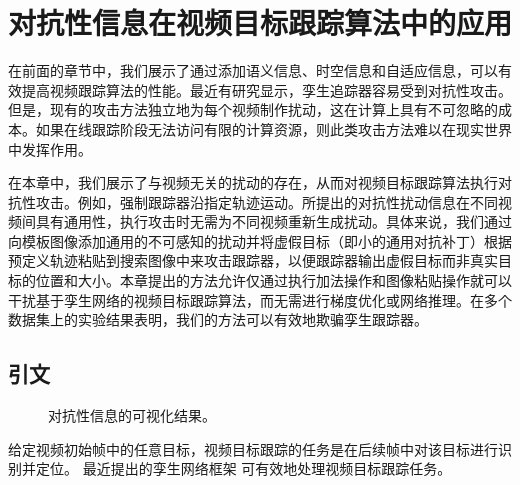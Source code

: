 \chapter{对抗性信息在视频目标跟踪算法中的应用} \label{chap:attack}
在前面的章节中，我们展示了通过添加语义信息、时空信息和自适应信息，可以有效提高视频跟踪算法的性能。最近有研究显示，孪生追踪器容易受到对抗性攻击。但是，现有的攻击方法独立地为每个视频制作扰动，这在计算上具有不可忽略的成本。如果在线跟踪阶段无法访问有限的计算资源，则此类攻击方法难以在现实世界中发挥作用。

在本章中，我们展示了与视频无关的扰动的存在，从而对视频目标跟踪算法执行对抗性攻击。例如，强制跟踪器沿指定轨迹运动。所提出的对抗性扰动信息在不同视频间具有通用性，执行攻击时无需为不同视频重新生成扰动。具体来说，我们通过向模板图像添加通用的不可感知的扰动并将虚假目标（即小的通用对抗补丁）根据预定义轨迹粘贴到搜索图像中来攻击跟踪器，以便跟踪器输出虚假目标而非真实目标的位置和大小。本章提出的方法允许仅通过执行加法操作和图像粘贴操作就可以干扰基于孪生网络的视频目标跟踪算法，而无需进行梯度优化或网络推理。在多个数据集上的实验结果表明，我们的方法可以有效地欺骗孪生跟踪器。

\section{引文}

\begin{figure}[t]
\centering
{} \qquad 
{}
\caption{对抗性信息的可视化结果。}
\end{figure}

给定视频初始帧中的任意目标，视频目标跟踪的任务是在后续帧中对该目标进行识别并定位。
最近提出的孪生网络框架 \cite{SiamFC,SiamRPN,SiamRPN++,SiamFC++} 可有效地处理视频目标跟踪任务。

